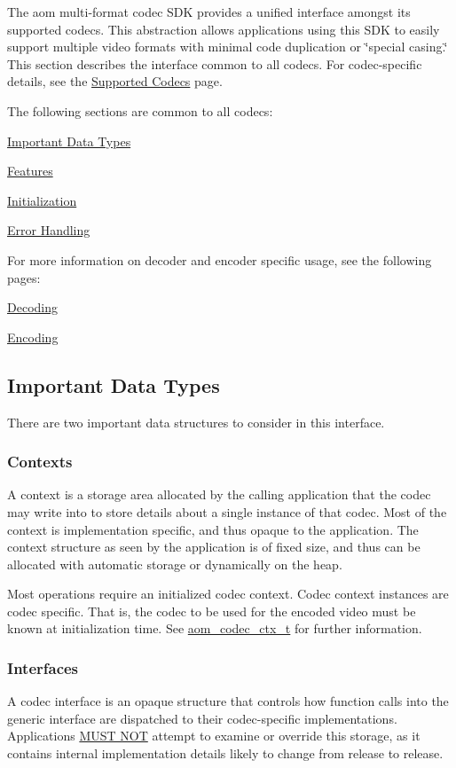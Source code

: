 The aom multi-\/format codec S\+DK provides a unified interface amongst its supported codecs. This abstraction allows applications using this S\+DK to easily support multiple video formats with minimal code duplication or \char`\"{}special casing.\char`\"{} This section describes the interface common to all codecs. For codec-\/specific details, see the \hyperlink{group__codecs}{Supported Codecs} page.

The following sections are common to all codecs\+:
\begin{DoxyItemize}
\item \hyperlink{usage_usage_types}{Important Data Types}
\item \hyperlink{usage_usage_features}{Features}
\item \hyperlink{usage_usage_init}{Initialization}
\item \hyperlink{usage_usage_errors}{Error Handling}
\end{DoxyItemize}

For more information on decoder and encoder specific usage, see the following pages\+: \begin{DoxyItemize}
\item \hyperlink{usage_decode}{Decoding} \item \hyperlink{usage_encode}{Encoding}\end{DoxyItemize}
\hypertarget{usage_usage_types}{}\subsection{Important Data Types}\label{usage_usage_types}
There are two important data structures to consider in this interface.\hypertarget{usage_usage_ctxs}{}\subsubsection{Contexts}\label{usage_usage_ctxs}
A context is a storage area allocated by the calling application that the codec may write into to store details about a single instance of that codec. Most of the context is implementation specific, and thus opaque to the application. The context structure as seen by the application is of fixed size, and thus can be allocated with automatic storage or dynamically on the heap.

Most operations require an initialized codec context. Codec context instances are codec specific. That is, the codec to be used for the encoded video must be known at initialization time. See \hyperlink{group__codec_ga9a1d27f9742d9f70783e3c6cb849b5b4}{aom\+\_\+codec\+\_\+ctx\+\_\+t} for further information.\hypertarget{usage_usage_ifaces}{}\subsubsection{Interfaces}\label{usage_usage_ifaces}
A codec interface is an opaque structure that controls how function calls into the generic interface are dispatched to their codec-\/specific implementations. Applications \hyperlink{rfc2119_MUSTNOT}{M\+U\+ST N\+OT} attempt to examine or override this storage, as it contains internal implementation details likely to change from release to release.

